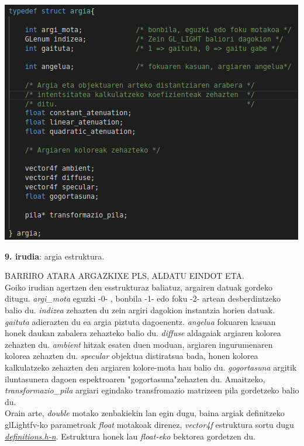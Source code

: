 \documentclass[12pt]{article}
\newcommand{\fitxategi}[1] {\underline{\textit{#1}}}
\newcommand{\aldagai}[1] {\textit{#1}}
\begin{document}
\begin{center}
\includegraphics[scale=2.5]{argia_estruktura.png}

\textbf{9. irudia}: argia estruktura.
\end{center}

BARRIRO ATARA ARGAZKIXE PLS, ALDATU EINDOT ETA.\\

Goiko irudian agertzen den esstrukturaz baliatuz, argairen datuak gordeko ditugu. \aldagai{argi\_mota} eguzki -0- , bonbila -1- edo foku -2- artean desberdintzeko balio du. \aldagai{indizea} zehazten du zein argiri dagokion instantzia horien datuak. \aldagai{gaituta} adierazten du ea argia piztuta dagoenentz. \aldagai{angelua} fokuaren kasuan honek daukan zabalera zehazteko balio du. \aldagai{diffuse} aldagaiak argiaren kolorea zehazten du. \aldagai{ambient} hitzak esaten duen moduan, argiaren ingurumenaren kolorea zehazten du. \aldagai{specular} objektua distiratsua bada, honen kolorea kalkulatzeko zehazten den argiaren kolore-mota hau balio du. \aldagai{gogortasuna} argitik iluntasunera dagoen espektroaren "gogortasuna"zehazten du. Amaitzeko, \aldagai{transformazio\_pila} argiari egindako transfromazio matrizeen pila gordetzeko balio du.\\

Orain arte, \aldagai{double} motako zenbakiekin lan egin dugu, baina argiak definitzeko glLightfv-ko parametroak \aldagai{float} motakoak direnez, \aldagai{vector4f} estruktura sortu dugu \fitxategi{definitions.h-n}. Estruktura honek lau \aldagai{float-eko} bektorea gordetzen du.\\
\end{document}
